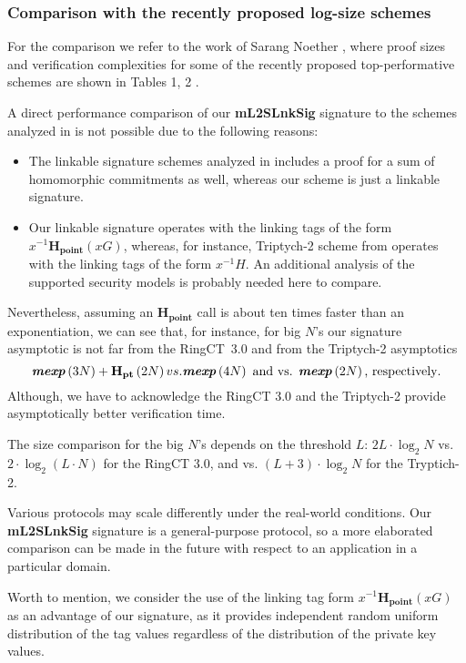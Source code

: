 \documentclass{mathcryptology} %
\newcommand{\Hpoint}{\textbf{H}_{\textbf{point}}}
\newcommand{\Hpt}{\textbf{H}_{\textbf{pt}}}
\newcommand{\mexp}{\textbf{\textit{mexp}}}
\theoremstyle{title}
\theoremstyle{titleof}
\begin{document}
\subsubsection{Comparison with the recently proposed log-size schemes}
    For the comparison we refer to the work of Sarang Noether \cite{14}, where proof sizes and verification complexities for some of the recently proposed top-performative schemes are shown in Tables 1, 2 \cite{14}.

    A direct performance comparison of our \textbf{mL2SLnkSig} signature to the schemes analyzed in \cite{14} is not possible due to the following reasons:
    \begin{itemize}
        \item The linkable signature schemes analyzed in \cite{14} includes a proof for a sum of homomorphic commitments as well, whereas our scheme is just a linkable signature.
        \item Our linkable signature operates with the linking tags of the form $x^{-1}\Hpoint\left(xG\right)$, whereas, for instance, Triptych-2 scheme from \cite{14} operates with the linking tags of the form $x^{-1}H$. An additional analysis of the supported security models is probably needed here to compare.
    \end{itemize}
    Nevertheless, assuming an $\Hpoint$ call is about ten times faster than an exponentiation, we can see that, for instance, for big $N$'s our signature asymptotic is not far from the RingCT~3.0 and from the Triptych-2 asymptotics
    \begin{equation*}
        \mexp \left(3N\right)+ \Hpt\left(2N\right) vs. \mexp\left(4N\right) \text{ and vs. } \mexp\left(2N\right)\text{, respectively}.
    \end{equation*}
    Although, we have to acknowledge the RingCT 3.0 and the Triptych-2 provide asymptotically better verification time.

    The size comparison for the big $N$'s depends on the threshold $L$: $2L\cdot \log_{2} N$ vs. $2\cdot \log_{2} \left(L\cdot N\right)$ for the RingCT 3.0, and vs. $\left(L+3\right)\cdot \log_{2} N$ for the Tryptich-2.

    Various protocols may scale differently under the real-world conditions. Our \textbf{mL2SLnkSig} signature is a general-purpose protocol, so a more elaborated comparison can be made in the future with respect to an application in a particular domain.

    Worth to mention, we consider the use of the linking tag form $x^{-1}\Hpoint\left(xG\right)$ as an advantage of our signature, as it provides independent random uniform distribution of the tag values regardless of the distribution of the private key values.
\end{document}
